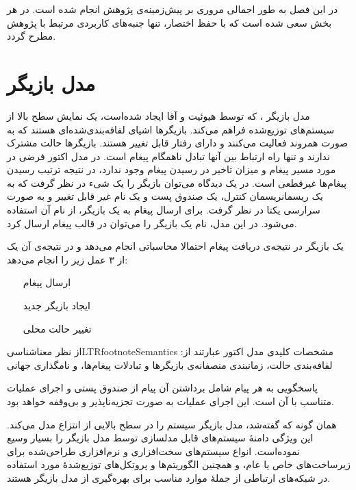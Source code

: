 در این فصل به طور اجمالی مروری بر پیش‌زمینه‌ی پژوهش انجام شده است. در هر بخش سعی شده است که با حفظ اختصار، تنها جنبه‌های  کاربردی مرتبط با پژوهش مطرح گردد.
\section{مدل بازیگر}

\gls{مدل بازیگر}%
، که توسط هیوئیت و آقا \cite{Hewitt1972,Agha1987,Agha1990} ایجاد شده‌است، یک نمایش سطح بالا از سیستم‌های توزیع‌شده فراهم می‌کند. 
\gls{بازیگر}ها
اشیای \gls{لفافه‌بندی‌شده}‌ای هستند که به صورت \gls{همروند} فعالیت می‌کنند و دارای \gls{رفتار} قابل تغییر هستند. 
بازیگرها \gls{حالت  مشترک} ندارند و تنها راه ارتباط بین آنها تبادل ناهمگام پیغام است. 
 در مدل اکتور فرضی در مورد مسیر پیغام و میزان تاخیر در رسیدن پیغام وجود ندارد، در نتیجه ترتیب رسیدن پیغام‌ها \gls{غیرقطعی} است.
 در یک دیدگاه می‌توان بازیگر را یک \gls{شی‌ء} در نظر گرفت که به یک ریسمان\gls{ریسمان} کنترل، یک صندوق پست و یک نام غیر قابل تغییر و به صورت سرارسی یکتا  در نظر گرفت. برای ارسال پیغام به یک بازیگر، از نام آن استفاده می‌شود. در این مدل، نام  یک بازیگر را می‌توان در قالب پیغام  ارسال کرد.
 
 یک بازیگر در نتیجه‌ی دریافت پیغام احتمالا محاسباتی انجام می‌دهد و در نتیجه‌ی آن یک از ۳ عمل زیر را انجام می‌دهد:
\begin{itemize}
\item[ارسال پیغام]
\item[ایجاد بازیگر جدید]
\item[تغییر حالت محلی]

\end{itemize} 
از نظر \gls{معناشناسی}LTRfootnote{Semantics} مشخصات کلیدی مدل اکتور عبارتند از: لفافه‌بندی حالت،  زمانبندی منصفانه‌ی بازیگرها و تبادلات پیغام‌ها، و نامگذاری جهانی
 
پاسخگویی به هر پیام شامل برداشتن آن پیام از صندوق پستی و اجرای عملیات متناسب با آن است.
این اجرای عملیات به صورت \gls{تجزیه‌ناپذیر} و بی‌وقفه خواهد بود.

همان گونه که گفته‌شد، مدل بازیگر سیستم را در سطح بالایی از انتزاع مدل می‌کند.
این ویژگی دامنهٔ سیستم‌های قابل مدلسازی توسط مدل بازیگر را بسیار وسیع نموده‌است.
انواع سیستم‌های سخت‌افزاری و نرم‌افزاری طراحی‌شده برای زیرساخت‌های خاص یا عام، و همچنین الگوریتم‌ها و پروتکل‌های توزیع‌شدهٔ مورد استفاده در شبکه‌های ارتباطی از جملهٔ موارد مناسب برای بهره‌گیری از مدل بازیگر هستند.

